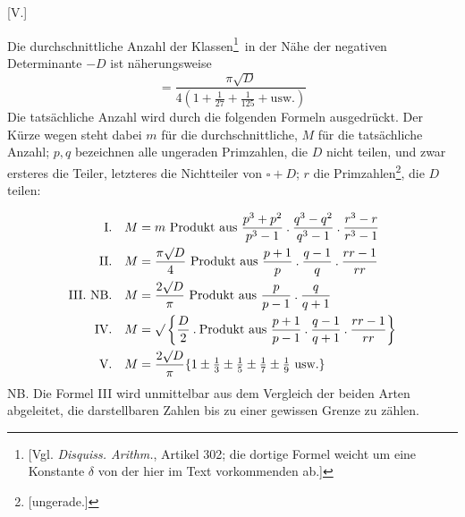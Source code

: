 \par\bigskip{}\centerline{[V.]}\medskip
Die durchschnittliche Anzahl der Klassen\begingroup\renewcommand{\thefootnote}{*)}\footnote{[Vgl. \emph{Disquiss. Arithm.}, Artikel 302; die dortige Formel weicht um eine Konstante $\delta$ von der hier im Text vorkommenden ab.]}\endgroup\ in der Nähe der negativen Determinante $-D$ ist näherungsweise
\[
=\frac{\pi\surd D}{4(1+\tfrac1{27}+\tfrac1{125}+\text{usw.})}
\]
Die tatsächliche Anzahl wird durch die folgenden Formeln ausgedrückt. Der Kürze wegen steht dabei $m$ für die durchschnittliche, $M$ für die tatsächliche Anzahl; $p,q$ bezeichnen alle ungeraden Primzahlen, die $D$ nicht teilen, und zwar ersteres die Teiler, letzteres die Nichtteiler von $\square+D$; $r$ die Primzahlen\begingroup\renewcommand{\thefootnote}{**)}\footnote{[ungerade.]}\endgroup, die $D$ teilen:

\[
\begin{aligned}
\text{I.}\quad M&=m\ \text{Produkt aus }\frac{p^3+p^2}{p^3-1}\mathbin{.}\frac{q^3-q^2}{q^3-1}\mathbin{.}\frac{r^3-r}{r^3-1}\\
\text{II.}\quad M&=\frac{\pi\surd D}4\ \text{Produkt aus }\frac{p+1}p\mathbin{.}\frac{q-1}q\mathbin{.}\frac{rr-1}{rr}\\
\text{III. NB.}\quad M&=\frac{2\surd D}\pi\ \text{Produkt aus }\frac p{p-1}\mathbin{.}\frac q{q+1}\\
\text{IV.}\quad M&=\surd\left\{\frac D2\mathbin{.}\text{Produkt aus }\frac{p+1}{p-1}\mathbin{.}\frac{q-1}{q+1}\mathbin{.}\frac{rr-1}{rr}\right\}\\
\text{V.}\quad M&=\frac{2\surd D}\pi\{1\pm\tfrac13\pm\tfrac15\pm\tfrac17\pm\tfrac19\text{ usw.}\}
\end{aligned}
\]
NB. Die Formel III wird unmittelbar aus dem Vergleich der beiden Arten abgeleitet, die darstellbaren Zahlen bis zu einer gewissen Grenze zu zählen.
